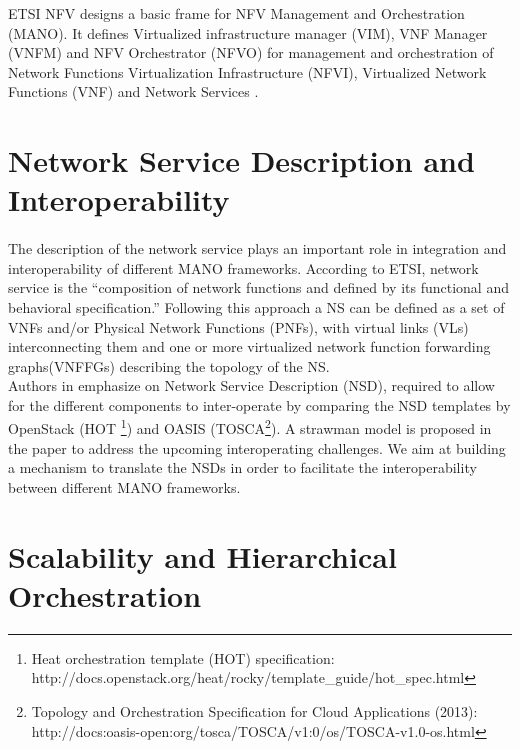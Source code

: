 ETSI NFV designs a basic frame for NFV Management and Orchestration (MANO). It defines Virtualized infrastructure manager (VIM), VNF Manager (VNFM) and NFV Orchestrator (NFVO) for management and orchestration of Network Functions Virtualization Infrastructure (NFVI), Virtualized Network Functions (VNF) and Network Services \cite{etsi2014gs}.


\section{Network Service Description and Interoperability}
\label{serviceDescription}
\paragraph{}
The description of the network service plays an important role in integration and interoperability of different MANO frameworks. According to ETSI, network service is the “composition of network functions and defined by its functional and behavioral specification.” Following this approach a NS can be defined as a set of VNFs and/or Physical Network Functions (PNFs), with virtual links (VLs) interconnecting them and one or more virtualized network function forwarding graphs(VNFFGs) describing the topology of the NS.\\

Authors in \cite{garay_service_2016} emphasize on Network Service Description (NSD), required to allow for the different components to inter-operate by comparing the NSD templates by OpenStack (HOT \footnote{Heat orchestration template (HOT) specification:        \\http://docs.openstack.org/heat/rocky/template\_guide/hot\_spec.html}) and OASIS (TOSCA\footnote{Topology and Orchestration Specification for Cloud Applications (2013):\\ http://docs:oasis-open:org/tosca/TOSCA/v1:0/os/TOSCA-v1.0-os.html}). A strawman model is proposed in the paper to address the upcoming interoperating challenges. We aim at building a mechanism to translate the NSDs in order to facilitate the interoperability between different MANO frameworks.




\section{Scalability and Hierarchical Orchestration}
\label{manoscale}

